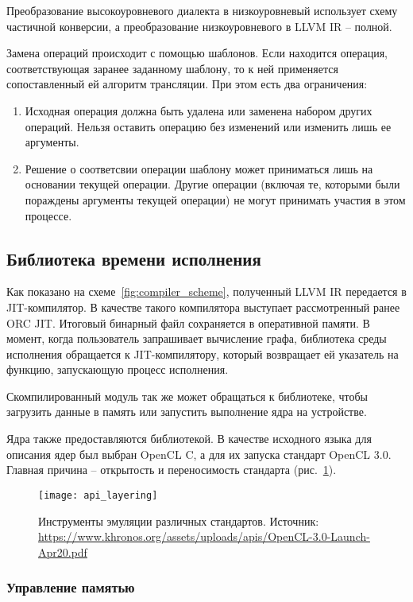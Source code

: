 Преобразование высокоуровневого диалекта в низкоуровневый использует схему
частичной конверсии, а преобразование низкоуровневого в LLVM IR -- полной.

Замена операций происходит с помощью шаблонов. Если находится операция,
соответствующая заранее заданному шаблону, то к ней применяется сопоставленный
ей алгоритм трансляции. При этом есть два ограничения:
\begin{enumerate}
  \item Исходная операция должна быть удалена или заменена набором других
  операций. Нельзя оставить операцию без изменений или изменить лишь ее аргументы.
  \item Решение о соответсвии операции шаблону может приниматься лишь на основании
  текущей операции. Другие операции (включая те, которыми были пораждены
  аргументы текущей операции) не могут принимать участия в этом процессе.
\end{enumerate}

\subsection{Библиотека времени исполнения}
Как показано на схеме~\ref{fig:compiler_scheme}, полученный LLVM IR передается
в JIT-компилятор. В качестве такого компилятора выступает рассмотренный ранее
ORC JIT. Итоговый бинарный файл сохраняется в оперативной памяти. В момент,
когда пользователь запрашивает вычисление графа, библиотека среды исполнения
обращается к JIT-компилятору, который возвращает ей указатель на функцию,
запускающую процесс исполнения.

Скомпилированный модуль так же может обращаться к библиотеке, чтобы загрузить
данные в память или запустить выполнение ядра на устройстве.

Ядра также предоставляются библиотекой. В качестве исходного языка для описания
ядер был выбран OpenCL C, а для их запуска стандарт OpenCL 3.0. Главная причина
-- открытость и переносимость стандарта (рис.~\ref{fig:api_layering}).

\begin{figure}[h]
  \centering
  \texttt{[image: api\_layering]}
  \caption{Инструменты эмуляции различных стандартов. Источник: \url{https://www.khronos.org/assets/uploads/apis/OpenCL-3.0-Launch-Apr20.pdf}}
  \label{fig:api_layering}
\end{figure}

\subsubsection{Управление памятью}

